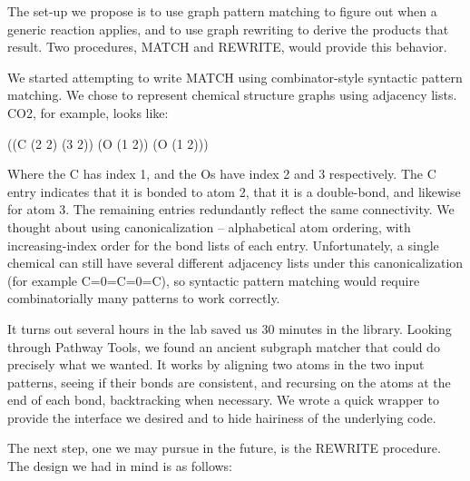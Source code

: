 The set-up we propose is to use graph pattern matching to figure out
when a generic reaction applies, and to use graph rewriting to derive
the products that result. Two procedures, MATCH and REWRITE, would
provide this behavior.

We started attempting to write MATCH using combinator-style syntactic
pattern matching. We chose to represent chemical structure graphs
using adjacency lists. CO2, for example, looks like:

((C (2 2) (3 2)) 
 (O (1 2)) 
 (O (1 2))) 

 Where the C has index 1, and the Os have index 2 and 3 respectively. The C
 entry indicates that it is bonded to atom 2, that it is a double-bond, and
 likewise for atom 3. The remaining entries redundantly reflect the same
 connectivity.  We thought about using canonicalization -- alphabetical
 atom ordering, with increasing-index order for the bond lists of each
 entry. Unfortunately, a single chemical can still have several different
 adjacency lists under this canonicalization (for example C=0=C=0=C), so
 syntactic pattern matching would require combinatorially many patterns to
 work correctly.

It turns out several hours in the lab saved us 30 minutes in the library.
Looking through Pathway Tools, we found an ancient subgraph matcher
that could do precisely what we wanted. It works by aligning two atoms
in the two input patterns, seeing if their bonds are consistent, and
recursing on the atoms at the end of each bond, backtracking when
necessary. We wrote a quick wrapper to provide the interface we desired
and to hide hairiness of the underlying code.

The next step, one we may pursue in the future, is the REWRITE procedure.
The design we had in mind is as follows:

\vspace{.1in}


